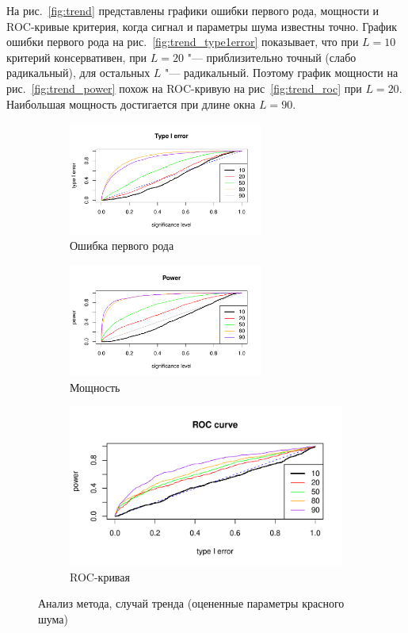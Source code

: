\documentclass[specialist,
substylefile = spbu_report.rtx,
subf,href,colorlinks=true, 12pt]{disser}
\theoremstyle{definition}
\begin{document}
На рис.~\ref{fig:trend} представлены графики ошибки первого рода, мощности и ROC-кривые критерия, когда сигнал и параметры шума известны точно. График ошибки первого рода на рис.~\ref{fig:trend_type1error} показывает, что при $L=10$ критерий консервативен, при $L=20$ "--- приблизительно точный (слабо радикальный), для остальных $L$ "--- радикальный. Поэтому график мощности на рис.~\ref{fig:trend_power} похож на ROC-кривую на рис~\ref{fig:trend_roc} при $L=20$. Наибольшая мощность достигается при длине окна $L=90$.

\begin{figure}[h]
	\captionsetup[subfigure]{justification=Centering}
	\begin{subfigure}[t]{\textwidth}
		\centering
		\includegraphics[width=0.7\textwidth]{img/type1error_trend_est_noise.pdf}
		\caption{Ошибка первого рода}
		\label{fig:trend_est_noise_type1error}
	\end{subfigure}
	\begin{subfigure}[t]{\textwidth}
		\centering
		\includegraphics[width=0.7\textwidth]{img/power_trend_est_noise.pdf}
		\caption{Мощность}
		\label{fig:trend_est_noise_power}
	\end{subfigure}
	\begin{subfigure}[t]{\textwidth}
		\centering
		\includegraphics[width=0.7\linewidth]{img/roc_trend_est_noise.pdf}
		\caption{ROC-кривая}
		\label{fig:trend_est_noise_roc}
	\end{subfigure}
	\caption{Анализ метода, случай тренда (оцененные параметры красного шума)}
	\label{fig:trend_est_noise}
\end{figure}
\end{document}
